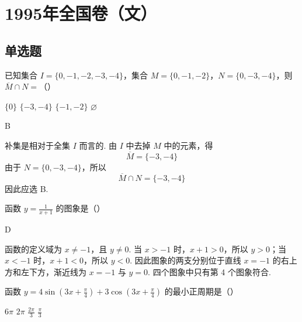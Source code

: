 \documentclass[UTF8,a4paper,oneside,11pt]{ctexbook}
\begin{document}
\mainmatter

\chapter{1995年全国卷（文）}
\section{单选题}

\begin{problem}
已知集合 \(I = \{0, -1, -2, -3, -4\}\)，集合 \(M = \{0, -1, -2\}\)，\(N = \{0, -3, -4\}\)，则 \(\overline{M} \cap N =\)（\quad）

\choices
    {\(\{0\}\)}
    {\(\{-3,-4\} \)}
    {\(\{-1,-2\} \)}
    {\(\varnothing\)}
\end{problem}

\begin{answer}
B
\end{answer}

\begin{solution}
补集是相对于全集 \(I\) 而言的. 由 \(I\) 中去掉 \(M\) 中的元素，得
\[
\overline{M}=\{-3,-4\}
\]
由于 \(N=\{0,-3,-4\}\)，所以
\[
\overline{M}\cap N=\{-3,-4\}
\]
因此应选 B.
\end{solution}

\begin{problem}
函数 \(y = \frac{1}{x + 1} \) 的图象是（\quad）

\choices
    {}
    {}
    {}
    {}
\end{problem}

\begin{answer}
D
\end{answer}

\begin{solution}
函数的定义域为 \(x\ne-1\)，且 \(y\ne0\). 当 \(x>-1\) 时，\(x+1>0\)，所以 \(y>0\)；当 \(x<-1\) 时，\(x+1<0\)，所以 \(y<0\). 因此图象的两支分别位于直线 \(x=-1\) 的右上方和左下方，渐近线为 \(x=-1\) 与 \(y=0\). 四个图象中只有第 4 个图象符合.
\end{solution}

\begin{problem}
函数 \(y = 4\sin \left(3x + \frac{\pi}{4}\right) + 3\cos \left(3x + \frac{\pi}{4}\right) \) 的最小正周期是（\quad）

\choices
    {\(6\pi\)}
    {\(2\pi\)}
    {\(\frac{2\pi}{3} \)}
    {\(\frac{\pi}{3}\)}
\end{problem}
\end{document}
